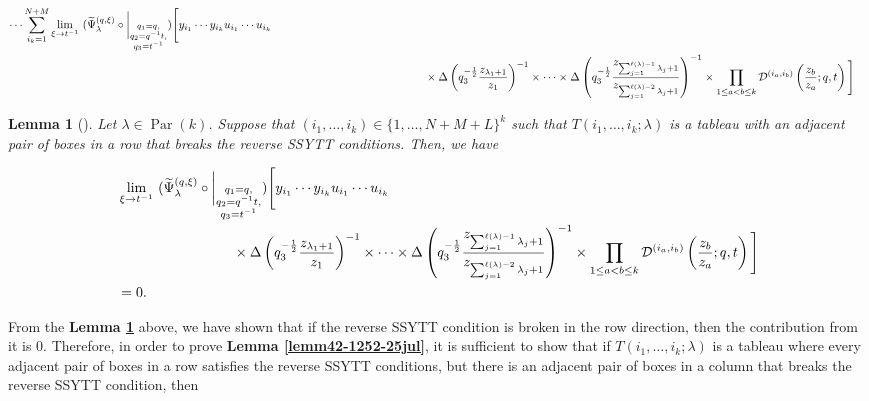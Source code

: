 \documentclass[12pt,reqno,a4paper]{amsart}
\newcommand{\comp}{\circ}
\newcommand{\cals}[1]{\mathcal{#1}}
\numberwithin{equation}{section}
\newtheorem{lem}[thm]{Lemma}
\newcommand{\dualmap}{
\widetilde{\Psi}^{(q,\xi)}_{\lambda}
}
\theoremstyle{definition}
\begin{document}
\begin{align}
	\cdots
	\sum_{i_k = 1}^{N+M}
	\lim_{\xi \rightarrow t^{-1}}\,\,
	(
	\dualmap
	\comp 
	\bigg|_{
		\substack{
			q_1 = q, \\
			q_2 = q^{-1}t,\\
			q_3 = t^{-1} \\
		}
	}
	)
	\Bigg[
	y_{i_1}\cdots y_{i_k}
	u_{i_1}\cdots u_{i_k}
	\notag 
	\\
	&\hspace{4.7cm}\times
	\Delta\left(	q_3^{-\frac{1}{2}}\frac{z_{\lambda_1 + 1}}{z_1}				\right)^{-1}
	\times 
	\cdots 
	\times 
	\Delta\left(	q_3^{-\frac{1}{2}}\frac{z_{\sum_{j = 1}^{\ell(\lambda) - 1}\lambda_j+1}}{z_{\sum_{j = 1}^{\ell(\lambda) - 2}\lambda_j+1}}				\right)^{-1}
	\times
	\prod_{1 \leq a < b \leq k}
	\cals{D}^{(i_a,i_b)}\left(
	\frac{z_b}{z_a}
	; q, t
	\right)
	\Bigg]
	\notag
\end{align}
\normalsize

\begin{lem}[\cite{CSW2025}]
\label{lemma2-1359-27jul}
Let $\lambda \in \operatorname{Par}(k)$. 
Suppose that $(i_1,\dots,i_k) \in \{1,\dots,N+M+L\}^k$ such that $T(i_1,\dots,i_k;\lambda)$ is a tableau with an adjacent pair of boxes in a row that breaks the reverse SSYTT conditions. Then, we have 

\footnotesize
\begin{align}
	&\lim_{\xi \rightarrow t^{-1}}\,\,
	(
	\dualmap
	\comp 
	\bigg|_{
		\substack{
			q_1 = q, \\
			q_2 = q^{-1}t,\\
			q_3 = t^{-1} \\
		}
	}
	)
	\Bigg[
	y_{i_1}\cdots y_{i_k}
	u_{i_1}\cdots u_{i_k}
	\\
	&\hspace{2.9cm}\times
	\Delta\left(	q_3^{-\frac{1}{2}}\frac{z_{\lambda_1 + 1}}{z_1}				\right)^{-1}
	\times 
	\cdots 
	\times 
	\Delta\left(	q_3^{-\frac{1}{2}}\frac{z_{\sum_{j = 1}^{\ell(\lambda) - 1}\lambda_j+1}}{z_{\sum_{j = 1}^{\ell(\lambda) - 2}\lambda_j+1}}				\right)^{-1}
	\times
	\prod_{1 \leq a < b \leq k}
	\cals{D}^{(i_a,i_b)}\left(
	\frac{z_b}{z_a}
	; q, t
	\right)
	\Bigg]
	\notag
	\\
	&= 0. 
	\notag 
\end{align}
\normalsize 
\end{lem}

From the \textbf{Lemma \ref{lemma2-1359-27jul}} above, we have shown that if the reverse SSYTT condition is broken in the row direction, then the contribution from it is $0$. Therefore, in order to prove \textbf{Lemma \ref{lemm42-1252-25jul}}, it is sufficient to show that if $T(i_1,\dots,i_k;\lambda)$ is a tableau where every adjacent pair of boxes in a row satisfies the reverse SSYTT conditions, but there is an adjacent pair of boxes in a column that breaks the reverse SSYTT condition, then
\end{document}
